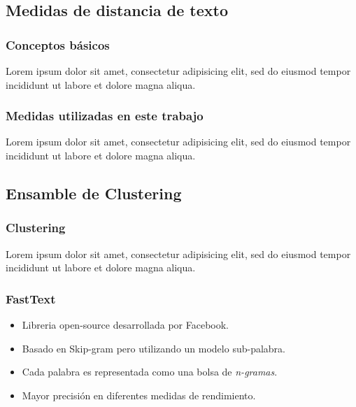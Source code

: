 \subsection{Medidas de distancia de texto}
\begin{frame}[allowframebreaks]
	\frametitle{Conceptos básicos}
	Lorem ipsum dolor sit amet, consectetur adipisicing elit, sed do eiusmod tempor incididunt ut labore et dolore magna aliqua.
\end{frame}

\begin{frame}[allowframebreaks]
	\frametitle{Medidas utilizadas en este trabajo}
	Lorem ipsum dolor sit amet, consectetur adipisicing elit, sed do eiusmod tempor incididunt ut labore et dolore magna aliqua.
\end{frame}

\subsection{Ensamble de Clustering}
\begin{frame}[allowframebreaks]
	\frametitle{Clustering}
	Lorem ipsum dolor sit amet, consectetur adipisicing elit, sed do eiusmod tempor incididunt ut labore et dolore magna aliqua.
\end{frame}

\begin{frame}
	\frametitle{FastText}
	\begin{itemize}
		\scriptsize
		\item Libreria open-source desarrollada por Facebook.
		\item Basado en Skip-gram pero utilizando un modelo sub-palabra.
		\item Cada palabra es representada como una bolsa de \textit{n-gramas}.
		\item Mayor precisión en diferentes medidas de rendimiento.
	\end{itemize}
\end{frame}

